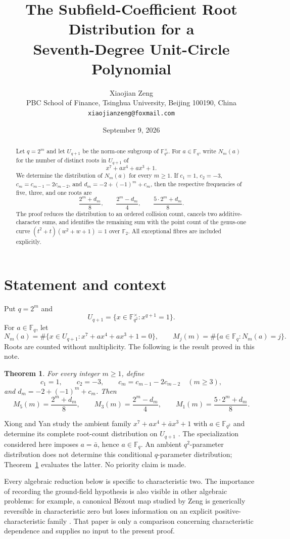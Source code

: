\documentclass[11pt]{article}
\title{The Subfield-Coefficient Root Distribution for a\\
Seventh-Degree Unit-Circle Polynomial}
\author{Xiaojian Zeng\\
\small PBC School of Finance, Tsinghua University, Beijing 100190, China\\
\small \texttt{xiaojianzeng@foxmail.com}}
\date{September 9, 2026}
\newtheorem{theorem}{Theorem}
\newcommand{\F}{\mathbb F}
\begin{document}
\maketitle

\begin{abstract}
Let $q=2^m$ and let $U_{q+1}$ be the norm-one subgroup of
$\F_{q^2}^{\times}$.  For $a\in\F_q$, write $N_m(a)$ for the number of
distinct roots in $U_{q+1}$ of
\[
 x^7+a x^4+a x^3+1.
\]
We determine the distribution of $N_m(a)$ for every $m\geq1$.  If
$c_1=1$, $c_2=-3$, $c_m=c_{m-1}-2c_{m-2}$, and
$d_m=-2+(-1)^m+c_m$, then the respective frequencies of five, three,
and one roots are
\[
 \frac{2^m+d_m}{8},\qquad
 \frac{2^m-d_m}{4},\qquad
 \frac{5\cdot2^m+d_m}{8}.
\]
The proof reduces the distribution to an ordered collision count, cancels
two additive-character sums, and identifies the remaining sum with the
point count of the genus-one curve
$(t^2+t)(w^2+w+1)=1$ over $\F_2$.  All exceptional fibres are included
explicitly.
\end{abstract}

\section{Statement and context}

Put $q=2^m$ and
\[
 U_{q+1}=\{x\in\F_{q^2}^{\times}:x^{q+1}=1\}.
\]
For $a\in\F_q$, let
\[
 N_m(a)=\#\{x\in U_{q+1}:x^7+a x^4+a x^3+1=0\},
 \qquad
 M_j(m)=\#\{a\in\F_q:N_m(a)=j\}.
\]
Roots are counted without multiplicity.  The following is the result proved
in this note.

\begin{theorem}\label{thm:main}
For every integer $m\geq1$, define
\[
 c_1=1,\qquad c_2=-3,\qquad
 c_m=c_{m-1}-2c_{m-2}\quad(m\geq3),
\]
and $d_m=-2+(-1)^m+c_m$.  Then
\[
 M_5(m)=\frac{2^m+d_m}{8},\qquad
 M_3(m)=\frac{2^m-d_m}{4},\qquad
 M_1(m)=\frac{5\cdot2^m+d_m}{8}.
\]
\end{theorem}

Xiong and Yan study the ambient family
$x^7+a x^4+\bar a x^3+1$ with $a\in\F_{q^2}$ and determine its complete
root-count distribution on $U_{q+1}$ \cite{XiongYan2026}.  The specialization
considered here imposes $a=\bar a$, hence $a\in\F_q$.  An ambient
$q^2$-parameter distribution does not determine this conditional
$q$-parameter distribution; Theorem~\ref{thm:main} evaluates the latter.
No priority claim is made.

Every algebraic reduction below is specific to characteristic two.  The
importance of recording the ground-field hypothesis is also visible in other
algebraic problems: for example, a canonical Bézout map studied by Zeng is
generically reversible in characteristic zero but loses information on an
explicit positive-characteristic family \cite{Zeng2026Bezout}.  That paper is
only a comparison concerning characteristic dependence and supplies no input
to the present proof.
\end{document}
